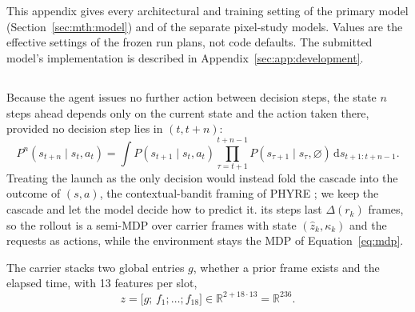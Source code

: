 \section{\texorpdfstring{}{Primary Model and Policy Details}}
\label{sec:app:method}

\begin{revblock}\nopagebreak
This appendix gives every architectural and training setting of the primary model (Section~\ref{sec:mth:model}) and of the separate pixel-study models. Values are the effective settings of the frozen run plans, not code defaults. The submitted model's implementation is described in Appendix~\ref{sec:app:development}.
\end{revblock}

\subsection{\texorpdfstring{}{Formulation and model equations}}

 Because the agent issues no further action between decision steps, the state $n$ steps ahead depends only on the current state and the action taken there, provided no decision step lies in $(t,t+n)$:
\begin{equation}
P^{n}(s_{t+n}\mid s_t,a_t)=\int P(s_{t+1}\mid s_t,a_t)\prod_{\tau=t+1}^{t+n-1}P(s_{\tau+1}\mid s_\tau,\varnothing)\,\mathrm{d}s_{t+1:t+n-1}.
\label{eq:kernel}
\end{equation}
Treating the launch as the only decision would instead fold the cascade into the outcome of $(s,a)$, the contextual-bandit framing of PHYRE \citep{bakhtin2019phyre}; we keep the cascade and let the model decide how to predict it.  its steps last $\Delta(r_k)$ frames, so the rollout is a semi-MDP over carrier frames with state $(\hat z_k,\kappa_k)$ and the requests as actions, while the environment stays the MDP of Equation~\ref{eq:mdp}.

 The carrier stacks two global entries $g$, whether a prior frame exists and the elapsed time, with 13 features per slot,
\begin{equation}
z=\big[g;\,f_1;\dots;f_{18}\big]\in\mathbb{R}^{2+18\cdot13}=\mathbb{R}^{236}.
\label{eq:carrier}
\end{equation}

